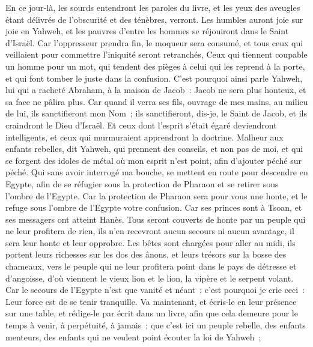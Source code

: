 \begin{multicols}{2}
En ce jour-là, les sourds entendront les paroles du livre, et les yeux des aveugles étant délivrés de l'obscurité et des ténèbres, verront.
Les humbles auront joie sur joie en Yahweh, et les pauvres d'entre les hommes se réjouiront dans le Saint d'Israël.
Car l'oppresseur prendra fin, le moqueur sera consumé, et tous ceux qui veillaient pour commettre l'iniquité seront retranchés,
Ceux qui tiennent coupable un homme pour un mot, qui tendent des pièges à celui qui les reprend à la porte, et qui font tomber le juste dans la confusion.
C'est pourquoi ainsi parle Yahweh, lui qui a racheté Abraham, à la maison de Jacob~: Jacob ne sera plus honteux, et sa face ne pâlira plus.
Car quand il verra ses fils, ouvrage de mes mains, au milieu de lui, ils sanctifieront mon Nom~; ils sanctifieront, dis-je, le Saint de Jacob, et ils craindront le Dieu d'Israël.
Et ceux dont l'esprit s'était égaré deviendront intelligents, et ceux qui murmuraient apprendront la doctrine.
\VerseOne{}Malheur aux enfants rebelles, dit Yahweh, qui prennent des conseils, et non pas de moi, et qui se forgent des idoles de métal où mon esprit n'est point, afin d'ajouter péché sur péché.
Qui sans avoir interrogé ma bouche, se mettent en route pour descendre en Egypte, afin de se réfugier sous la protection de Pharaon et se retirer sous l'ombre de l'Egypte.
Car la protection de Pharaon sera pour vous une honte, et le refuge sous l'ombre de l'Egypte votre confusion.
Car ses princes sont à Tsoan, et ses messagers ont atteint Hanès.
Tous seront couverts de honte par un peuple qui ne leur profitera de rien, ils n'en recevront aucun secours ni aucun avantage, il sera leur honte et leur opprobre.
Les bêtes sont chargées pour aller au midi, ils portent leurs richesses sur les dos des ânons, et leurs trésors sur la bosse des chameaux, vers le peuple qui ne leur profitera point dans le pays de détresse et d'angoisse, d'où viennent le vieux lion et le lion, la vipère et le serpent volant.
Car le secours de l'Egypte n'est que vanité et néant~; c'est pourquoi je crie ceci~: Leur force est de se tenir tranquille.
Va maintenant, et écris-le en leur présence sur une table, et rédige-le par écrit dans un livre, afin que cela demeure pour le temps à venir, à perpétuité, à jamais~;
que c'est ici un peuple rebelle, des enfants menteurs, des enfants qui ne veulent point écouter la loi de Yahweh~;

\end{multicols}

